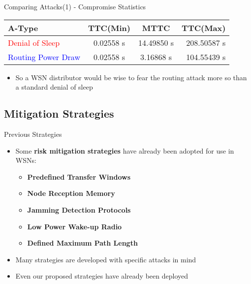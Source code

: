 \documentclass{beamer}
\begin{document}
\begin{frame}{Comparing Attacks(1) - Compromise Statistics}
\centering
	\begin{tabular}{| l | c | c | r |}
	\hline
	\textbf{A-Type} & \textbf{TTC(Min)} & \textbf{MTTC} & \textbf{TTC(Max)} \\
	\hline
	\hline
	\textcolor{red}{Denial of Sleep} &  0.02558 s & 14.49850 s & 208.50587 s\\
	\hline
	\textcolor{blue}{Routing Power Draw} &  0.02558 s & 3.16868 s & 104.55439 s\\
	\hline
	\end{tabular}
	\begin{itemize}
	\item So a WSN distributor would be wise to fear the routing attack more so than a standard denial of sleep
	\end{itemize}
	

\end{frame}
\subsection{Mitigation Strategies}

\begin{frame}{Previous Strategies}

\begin{itemize}

	\item Some \textbf{risk mitigation strategies} have already been adopted for use in WSNs:
	\begin{itemize}
		\item \textbf{Predefined Transfer Windows}
		\item \textbf{Node Reception Memory}
		\item \textbf{Jamming Detection Protocols}
		\item \textbf{Low Power Wake-up Radio}
		\item \textbf{Defined Maximum Path Length}
	\end{itemize}
	\item Many strategies are developed with specific attacks in mind
	\item Even our proposed strategies have already been deployed
	
\end{itemize}

\end{frame}
\end{document}
